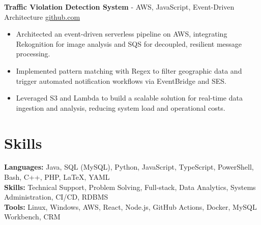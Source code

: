 \documentclass[11pt]{article}       %
\begin{document}
\textbf{Traffic Violation Detection System}{ - AWS, JavaScript, Event-Driven Architecture} \hfill \href{https://github.com/Monica20030707/AWS_rekonigition-N-read-database}{github.com} \\
\vspace{-9pt}
\begin{itemize}
  \item Architected an event-driven serverless pipeline on AWS, integrating Rekognition for image analysis and SQS for decoupled, resilient message processing.
  \item Implemented pattern matching with Regex to filter geographic data and trigger automated notification workflows via EventBridge and SES.
  \item Leveraged S3 and Lambda to build a scalable solution for real-time data ingestion and analysis, reducing system load and operational costs.
\end{itemize}

\vspace{-18.5pt}


\section*{Skills}
\textbf{Languages:} Java, SQL (MySQL), Python, JavaScript, TypeScript, PowerShell, Bash, C++, PHP, LaTeX, YAML\\
\textbf{Skills:} Technical Support, Problem Solving, Full-stack, Data Analytics, Systems Administration, CI/CD, RDBMS\\
\textbf{Tools:} Linux, Windows, AWS, React, Node.js, GitHub Actions, Docker, MySQL Workbench, CRM\\

\vspace{-6.5pt}
\end{document}
